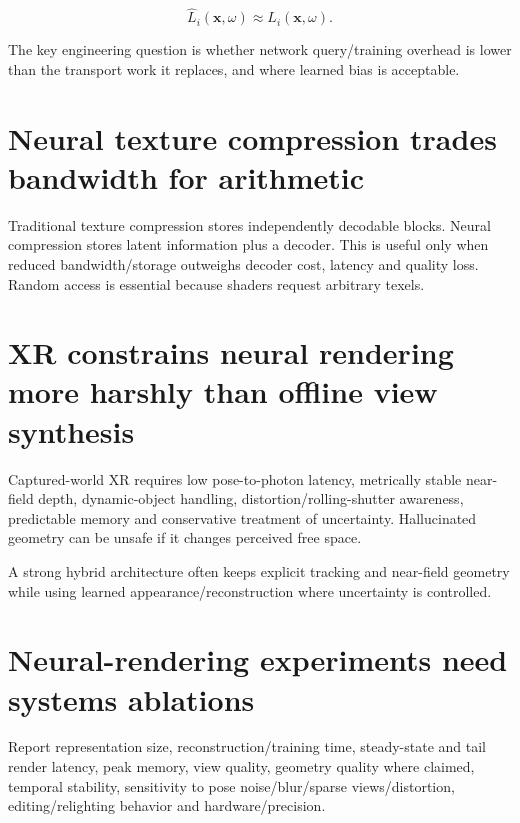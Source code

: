 \[
\hat L_i(\mathbf x,\omega)\approx L_i(\mathbf x,\omega).
\]

The key engineering question is whether network query/training overhead is lower than the transport work it replaces, and where learned bias is acceptable.

\section{Neural texture compression trades bandwidth for arithmetic}\label{04-visual-computing-ii-ch035-neural-texture-compression-trades-bandwidth-for-arithmetic}

Traditional texture compression stores independently decodable blocks. Neural compression stores latent information plus a decoder. This is useful only when reduced bandwidth/storage outweighs decoder cost, latency and quality loss. Random access is essential because shaders request arbitrary texels.

\section{XR constrains neural rendering more harshly than offline view synthesis}\label{04-visual-computing-ii-ch035-xr-constrains-neural-rendering-more-harshly-than-offline-view-synthesis}

Captured-world XR requires low pose-to-photon latency, metrically stable near-field depth, dynamic-object handling, distortion/rolling-shutter awareness, predictable memory and conservative treatment of uncertainty. Hallucinated geometry can be unsafe if it changes perceived free space.

A strong hybrid architecture often keeps explicit tracking and near-field geometry while using learned appearance/reconstruction where uncertainty is controlled.

\section{Neural-rendering experiments need systems ablations}\label{04-visual-computing-ii-ch035-neural-rendering-experiments-need-systems-ablations}

Report representation size, reconstruction/training time, steady-state and tail render latency, peak memory, view quality, geometry quality where claimed, temporal stability, sensitivity to pose noise/blur/sparse views/distortion, editing/relighting behavior and hardware/precision.

